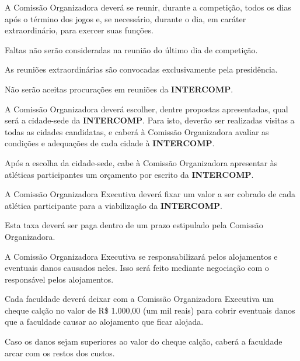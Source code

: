 \begin{article}
	A Comissão Organizadora deverá se reunir, durante a competição, todos os dias após o término dos jogos e, se necessário, durante o dia, em caráter extraordinário, para exercer suas funções.

	\begin{xparagraph}
		Faltas não serão consideradas na reunião do último dia de competição.
	\end{xparagraph}

	\begin{xparagraph}
		As reuniões extraordinárias são convocadas exclusivamente pela presidência.
	\end{xparagraph}
\end{article}

\begin{article}
	Não serão aceitas procurações em reuniões da \textbf{INTERCOMP}.
\end{article}

\begin{article}
	A Comissão Organizadora deverá escolher, dentre propostas apresentadas, qual será a cidade-sede da \textbf{INTERCOMP}. Para isto, deverão ser realizadas visitas a todas as cidades candidatas, e caberá à Comissão Organizadora avaliar as condições e adequações de cada cidade à \textbf{INTERCOMP}.

	\begin{xparagraph}
		Após a escolha da cidade-sede, cabe à Comissão Organizadora apresentar às atléticas participantes um orçamento por escrito da \textbf{INTERCOMP}.
	\end{xparagraph}

	\begin{xparagraph}
		A Comissão Organizadora Executiva deverá fixar um valor a ser cobrado de cada atlética participante para a viabilização da \textbf{INTERCOMP}.
	\end{xparagraph}

	\begin{xparagraph}
		Esta taxa deverá ser paga dentro de um prazo estipulado pela Comissão Organizadora.
	\end{xparagraph}

	\begin{xparagraph}
		A Comissão Organizadora Executiva se responsabilizará pelos alojamentos e eventuais danos causados neles. Isso será feito mediante negociação com o responsável pelos alojamentos.
	\end{xparagraph}

	\begin{xparagraph}
		Cada faculdade deverá deixar com a Comissão Organizadora Executiva um cheque calção no valor de R\$ 1.000,00 (um mil reais) para cobrir eventuais danos que a faculdade causar ao alojamento que ficar alojada.
	\end{xparagraph}

	\begin{xparagraph}
		Caso os danos sejam superiores ao valor do cheque calção, caberá a faculdade arcar com os restos dos custos.
	\end{xparagraph}
\end{article}

